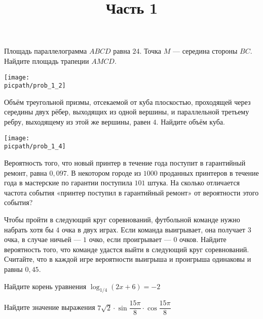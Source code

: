 \begin{training}[3]
	\title{Часть 1}
	\egepreambone
	\begin{listofex}
		\item
		\begin{minipage}[t]{\bodywidth}
			Площадь параллелограмма \( ABCD \) равна \( 2 \)4.
			Точка \( M \) --- середина стороны \( BC \).
			Найдите площадь трапеции \( AMCD \).
			\foranswer
		\end{minipage}
		\gapwidth
		\begin{minipage}[t]{\picwidth}
			\texttt{[image: \\picpath/prob\_1\_2]}
		\end{minipage}
		\item
		\begin{minipage}[t]{\bodywidth}
			Объём треугольной призмы,
			отсекаемой от куба плоскостью, проходящей через
			середины двух рёбер, выходящих из одной
			вершины, и параллельной третьему ребру,
			выходящему из этой же вершины, равен \( 4 \).
			Найдите объём куба.
			\foranswer
		\end{minipage}
		\gapwidth
		\begin{minipage}[t]{\picwidth}
			\texttt{[image: \\picpath/prob\_1\_4]}
		\end{minipage}
		\item Вероятность того, что новый принтер в течение года поступит в гарантийный ремонт, равна \( 0, 097 \).
		В некотором городе из \( 1000 \) проданных принтеров в течение года в мастерские по гарантии поступила \( 101 \) штука.
		На сколько отличается частота события «принтер поступил в гарантийный ремонт» от вероятности этого события?
		\foranswer
		\item Чтобы пройти в следующий круг соревнований,
		футбольной команде нужно набрать хотя бы \( 4 \) очка в двух играх.
		Если команда выигрывает, она получает \( 3 \) очка,
		в случае ничьей --- \( 1 \) очко, если проигрывает --- \( 0 \) очков.
		Найдите вероятность того, что команде удастся выйти в следующий круг соревнований.
		Считайте, что в каждой игре вероятности выигрыша и
		проигрыша одинаковы и равны \( 0,45 \).
		\foranswer
		\newpage
		\hphantom{Часть 1}
		\item Найдите корень уравнения \( \log_{1/4}(2x+6)=-2 \)
		\foranswer
		\item Найдите значение выражения
		\( 7\sqrt{2}\cdot\sin\dfrac{15\pi}{8}\cdot\cos\dfrac{15\pi}{8} \)
		\foranswer
		\item 

\end{listofex}
\end{training}
